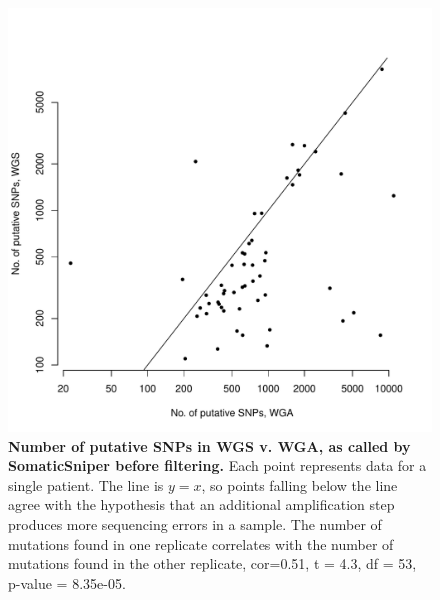 \documentclass[11pt]{article} %
\begin{document}
\begin{figure}
\centerline{
\includegraphics[width=5in]{C282_v_C484.pdf} }
\caption{\textbf{Number of putative SNPs in WGS v. WGA, as called by SomaticSniper before filtering.} Each point represents data for a single patient. The line is $y=x$, so points falling below the line agree with the hypothesis that an additional amplification step produces more sequencing errors in a sample. The number of mutations found in one replicate correlates with the number of mutations found in the other replicate, cor=0.51, t = 4.3, df = 53, p-value = 8.35e-05.}
\label{fig:C282_v_C484}
\end{figure}
\end{document}
